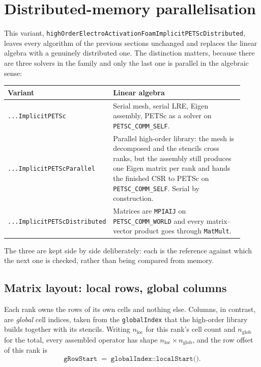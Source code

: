 \documentclass[11pt,a4paper]{article}
\newcommand{\code}[1]{\texttt{\small #1}}
\begin{document}
\section{Distributed-memory parallelisation}
\label{sec:distributed}

This variant, \code{highOrderElectroActivationFoamImplicitPETScDistributed},
leaves every algorithm of the previous sections unchanged and replaces the
linear algebra with a genuinely distributed one. The distinction matters,
because there are three solvers in the family and only the last one is parallel
in the algebraic sense:

\begin{center}
\begin{tabular}{@{}p{0.30\linewidth}p{0.62\linewidth}@{}}
\toprule
Variant & Linear algebra \\
\midrule
\code{...ImplicitPETSc} & Serial mesh, serial LRE, Eigen assembly, PETSc as a
   solver on \code{PETSC\_COMM\_SELF}. \\
\code{...ImplicitPETScParallel} & Parallel high-order library: the mesh is
   decomposed and the stencils cross ranks, but the assembly still produces one
   Eigen matrix per rank and hands the finished CSR to PETSc on
   \code{PETSC\_COMM\_SELF}. Serial by construction. \\
\code{...ImplicitPETScDistributed} & Matrices are \code{MPIAIJ} on
   \code{PETSC\_COMM\_WORLD} and every matrix--vector product goes through
   \code{MatMult}. \\
\bottomrule
\end{tabular}
\end{center}

The three are kept side by side deliberately: each is the reference against
which the next one is checked, rather than being compared from memory.

\subsection{Matrix layout: local rows, global columns}
\label{sec:dist-layout}

Each rank owns the rows of its own cells and nothing else. Columns, in contrast,
are \emph{global} cell indices, taken from the \code{globalIndex} that the
high-order library builds together with its stencils. Writing
$n_{\text{loc}}$ for this rank's cell count and $n_{\text{glob}}$ for the total,
every assembled operator has shape $n_{\text{loc}}\times n_{\text{glob}}$, and
the row offset of this rank is
\[
   \texttt{gRowStart} \;=\; \texttt{globalIndex::localStart()} .
\]
\end{document}
